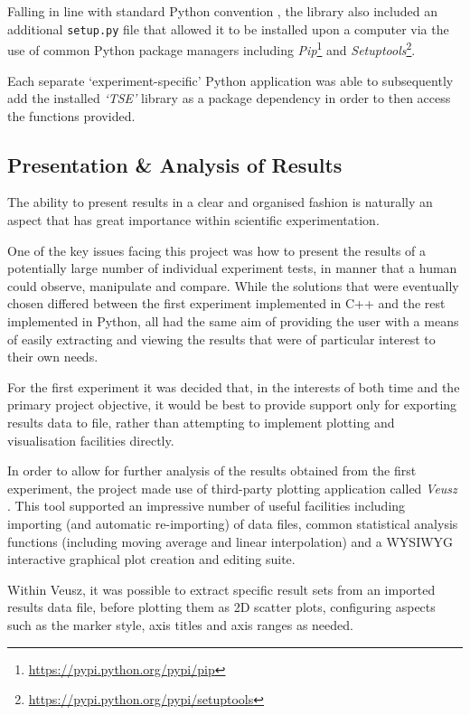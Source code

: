 Falling in line with standard Python convention \cite{setup}, the library also included an additional \texttt{setup.py} file that allowed it to be installed upon a computer via the use of common Python package managers including \textit{Pip}\footnote{\url{https://pypi.python.org/pypi/pip}} and \textit{Setuptools}\footnote{\url{https://pypi.python.org/pypi/setuptools}}.

Each separate `experiment-specific' Python application was able to subsequently add the installed \textit{`TSE'} library as a package dependency in order to then access the functions provided.

\subsection{Presentation \& Analysis of Results}
\label{display}

The ability to present results in a clear and organised fashion is naturally an aspect that has great importance within scientific experimentation. 

One of the key issues facing this project was how to present the results of a potentially large number of individual experiment tests, in manner that a human could observe, manipulate and compare. While the solutions that were eventually chosen differed between the first experiment implemented in C++ and the rest implemented in Python, all had the same aim of providing the user with a means of easily extracting and viewing the results that were of particular interest to their own needs.

For the first experiment it was decided that, in the interests of both time and the primary project objective, it would be best to provide support only for exporting results data to file, rather than attempting to implement plotting and visualisation facilities directly. 

In order to allow for further analysis of the results obtained from the first experiment, the project made use of third-party plotting application called \textit{Veusz} \cite{veusz}. This tool supported an impressive number of useful facilities including importing (and automatic re-importing) of data files, common statistical analysis functions (including moving average and linear interpolation) and a WYSIWYG interactive graphical plot creation and editing suite. 

Within Veusz, it was possible to extract specific result sets from an imported results data file, before plotting them as 2D scatter plots, configuring aspects such as the marker style, axis titles and axis ranges as needed.   


